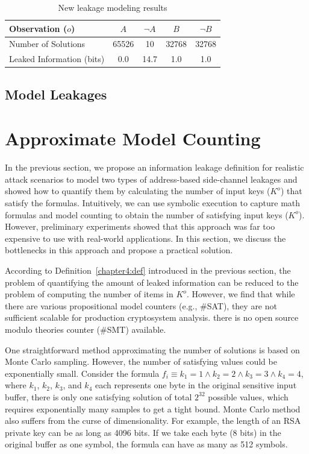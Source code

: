 \begin{table}[ht]
    \centering\small\footnotesize
    \caption{New leakage modeling results}
    \label{shtable2}
    \vspace*{-9pt}
    \begin{tabular}{l|cc|cc}
        \hline

        Observation ($o$)         & $A$   & $\neg A$ & $B$   & $\neg B$ \\ \hline
        Number of Solutions       & 65526 & 10       & 32768 & 32768    \\ \hline
        Leaked Information (bits) & 0.0   & 14.7     & 1.0   & 1.0      \\
        \hline
    \end{tabular}
\end{table}

\subsection{Model Leakages}
\section{Approximate Model Counting}
\label{MCreasons}
In the previous section, we propose an information leakage definition for realistic attack scenarios to model two types of address-based side-channel leakages and showed how to quantify them by calculating the number of input keys ($K^o$) that satisfy the formulas. Intuitively, we can use symbolic execution to capture math formulas and model counting to obtain the number of satisfying input keys ($K^o$). However, preliminary experiments showed that this approach was far too expensive to use with real-world applications. In this section, we discuss the bottlenecks in this approach and propose a practical solution.


According to Definition~\ref{chapter4:def} introduced in the previous section,
the problem of quantifying the amount of leaked information can be reduced to
the problem of computing the number of items in $K^o$. However, we find that while
there are various propositional model counters (e.g., \#SAT), they are not
sufficient scalable for production cryptosystem analysis.
there is no open source modulo theories counter (\#SMT) available.

One straightforward method approximating the number of solutions is based on Monte Carlo
sampling. However, the number of satisfying values could be exponentially small.
Consider the formula $f_i\equiv{k_1} = 1\land{k_2} = 2\land{k_3} = 3\land{k_4} =
    4$, where $k_1$, $k_2$, $k_3$, and $k_4$ each represents one byte in the
original sensitive input buffer, there is only one satisfying solution of total
$2^{32}$ possible values, which requires exponentially many samples to get a
tight bound. Monte Carlo method also suffers from the curse of dimensionality.
For example, the length of an RSA private key can be as long as 4096 bits. If we
take each byte (8 bits) in the original buffer as one symbol, the formula can
have as many as 512 symbols.

